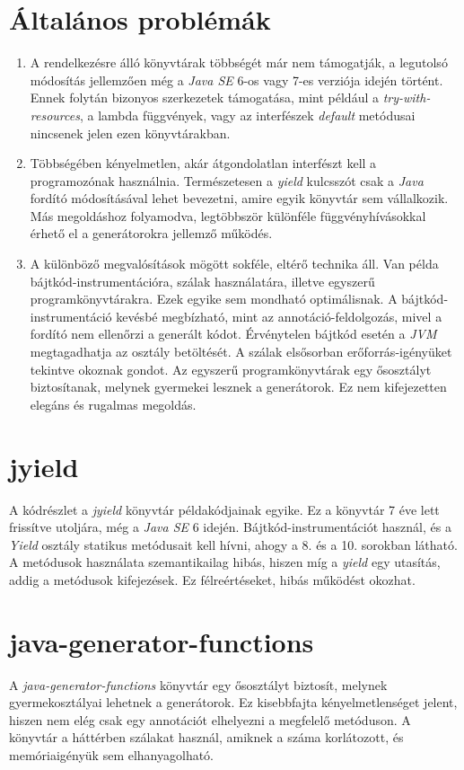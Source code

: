 \documentclass[12pt, a4paper]{article}
\begin{document}
\section{Általános problémák}
\begin{enumerate}
    \item
    A rendelkezésre álló könyvtárak többségét már nem támogatják, a legutolsó módosítás jellemzően még a \textit{Java SE} 6-os vagy 7-es verziója idején történt. Ennek folytán bizonyos szerkezetek támogatása, mint például a \textit{try-with-resources}, a lambda függvények, vagy az interfészek \textit{default} metódusai nincsenek jelen ezen könyvtárakban.
    \item
    Többségében kényelmetlen, akár átgondolatlan interfészt kell a programozónak használnia. Természetesen a \textit{yield} kulcsszót csak a \textit{Java} fordító módosításával lehet bevezetni, amire egyik könyvtár sem vállalkozik. Más megoldáshoz folyamodva, legtöbbször különféle függvényhívásokkal érhető el a generátorokra jellemző működés.
    \item
    A különböző megvalósítások mögött sokféle, eltérő technika áll. Van példa bájtkód-instrumentációra, szálak használatára, illetve egyszerű programkönyvtárakra. Ezek egyike sem mondható optimálisnak. A bájtkód-instrumentáció kevésbé megbízható, mint az annotáció-feldolgozás, mivel a fordító nem ellenőrzi a generált kódot. Érvénytelen bájtkód esetén a \textit{JVM} megtagadhatja az osztály betöltését. A szálak elsősorban erőforrás-igényüket tekintve okoznak gondot. Az egyszerű programkönyvtárak egy ősosztályt biztosítanak, melynek gyermekei lesznek a generátorok. Ez nem kifejezetten elegáns és rugalmas megoldás.
\end{enumerate}

\section{jyield}
A kódrészlet a \textit{jyield} könyvtár példakódjainak egyike. Ez a könyvtár 7 éve lett frissítve utoljára, még a \textit{Java SE} 6 idején. Bájtkód-instrumentációt használ, és a \textit{Yield} osztály statikus metódusait kell hívni, ahogy a 8. és a 10. sorokban látható. A metódusok használata szemantikailag hibás, hiszen míg a \textit{yield} egy utasítás, addig a metódusok kifejezések. Ez félreértéseket, hibás működést okozhat.

\section{java-generator-functions}
A \textit{java-generator-functions} könyvtár egy ősosztályt biztosít, melynek gyermekosztályai lehetnek a generátorok. Ez kisebbfajta kényelmetlenséget jelent, hiszen nem elég csak egy annotációt elhelyezni a megfelelő metóduson. A könyvtár a háttérben szálakat használ, amiknek a száma korlátozott, és memóriaigényük sem elhanyagolható.
\end{document}
